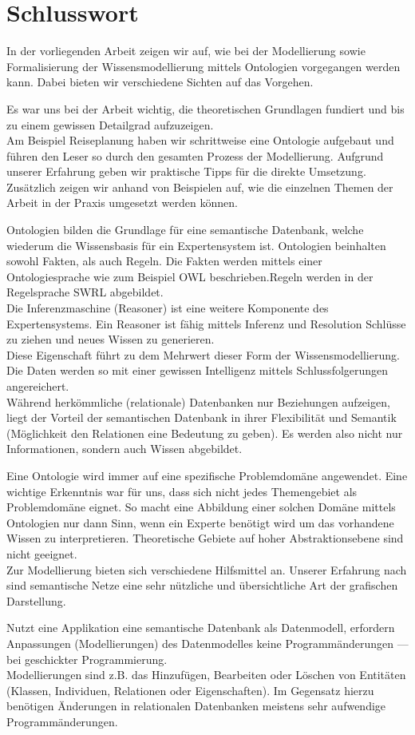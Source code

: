 \chapter{Schlusswort}
\label{chap:schlusswort}

In der vorliegenden Arbeit zeigen wir auf, wie bei der Modellierung sowie Formalisierung der Wissensmodellierung mittels Ontologien vorgegangen werden kann. Dabei bieten wir verschiedene Sichten auf das Vorgehen. 

Es war uns bei der Arbeit wichtig, die theoretischen Grundlagen fundiert und bis zu einem gewissen Detailgrad aufzuzeigen. \\
Am Beispiel Reiseplanung haben wir schrittweise eine Ontologie aufgebaut und führen den Leser so durch den gesamten Prozess der Modellierung. Aufgrund unserer Erfahrung geben wir praktische Tipps für die direkte Umsetzung. Zusätzlich zeigen wir anhand von Beispielen auf, wie die einzelnen Themen der Arbeit in der Praxis umgesetzt werden können.

Ontologien bilden die Grundlage für eine semantische Datenbank, welche wiederum die Wissensbasis für ein Expertensystem ist. Ontologien beinhalten sowohl Fakten, als auch Regeln. Die Fakten werden mittels einer Ontologiesprache wie zum Beispiel OWL beschrieben.Regeln werden in der Regelsprache SWRL abgebildet.\\
Die Inferenzmaschine (Reasoner) ist eine weitere Komponente des Expertensystems. Ein Reasoner ist fähig mittels Inferenz und Resolution Schlüsse zu ziehen und neues Wissen zu generieren.\\
Diese Eigenschaft führt zu dem Mehrwert dieser Form der Wissensmodellierung. Die Daten werden so mit einer gewissen Intelligenz mittels Schlussfolgerungen angereichert.\\
Während herkömmliche (relationale) Datenbanken nur Beziehungen aufzeigen, liegt der Vorteil der semantischen Datenbank in ihrer Flexibilität und Semantik (Möglichkeit den Relationen eine Bedeutung zu geben). Es werden also nicht nur Informationen, sondern auch Wissen abgebildet.

Eine Ontologie wird immer auf eine spezifische Problemdomäne angewendet. Eine wichtige Erkenntnis war für uns, dass sich nicht jedes Themengebiet als Problemdomäne eignet. So macht eine Abbildung einer solchen Domäne mittels Ontologien nur dann Sinn, wenn ein Experte benötigt wird um das vorhandene Wissen zu interpretieren.
Theoretische Gebiete auf hoher Abstraktionsebene sind nicht geeignet.\\
Zur Modellierung bieten sich verschiedene Hilfsmittel an. Unserer Erfahrung nach sind semantische Netze eine sehr nützliche und übersichtliche Art der grafischen Darstellung.

Nutzt eine Applikation eine semantische Datenbank als Datenmodell, erfordern Anpassungen (Modellierungen) des Datenmodelles keine Programmänderungen --- bei geschickter Programmierung.\\
Modellierungen sind z.B. das Hinzufügen, Bearbeiten oder Löschen von Entitäten (Klassen, Individuen, Relationen oder Eigenschaften).
Im Gegensatz hierzu benötigen Änderungen in relationalen Datenbanken meistens sehr aufwendige Programmänderungen.




